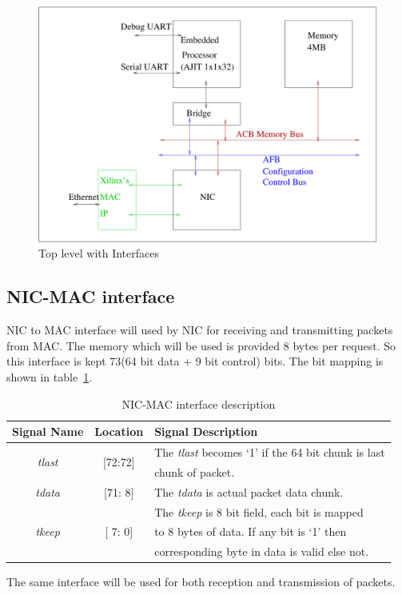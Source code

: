 \documentclass[12pt]{report}
\begin{document}
		\begin{figure}[h]
			\centering
			\includegraphics[width=12cm]{./figures/top_level_for_interfaces.pdf}
			\caption{Top level with Interfaces}
			\label{fig:NIC-Proc-top-level}
		\end{figure}




		\subsection{NIC-MAC interface}
			NIC to MAC interface will used by NIC for receiving and transmitting packets from MAC. The memory which will be used is provided 8 bytes per request.
			So this interface is kept 73(64 bit data + 9 bit control) bits. The bit mapping is shown in table~\ref{tab:NIC-MAC-interface}.
				\begin{table}[!htbp]
					\centering
					\begin{tabular}{ccl}
						\hline
						\textbf{Signal Name} & \textbf{Location} &\textbf{Signal Description}  \\ \hline
						\multirow{2}{*}{\textit{tlast}}	& \multirow{2}{*}{[72:72]}	& The \textit{tlast} becomes `1' if the 64 bit chunk is last\\
										& 				& chunk of packet.\\ \hline
						\textit{tdata}   		& [71: 8] 			& The \textit{tdata} is actual packet data chunk.\\ \hline
						\multirow{3}{*}{\textit{tkeep}}	& \multirow{3}{*}{[ 7: 0]}	& The \textit{tkeep} is 8 bit field, each bit is mapped\\
										&				& to 8 bytes of data. If any bit is `1' then\\
										& 				& corresponding byte in data is valid else not.\\ \hline 
					\end{tabular}
					\caption{NIC-MAC interface description}
					\label{tab:NIC-MAC-interface}
				\end{table}
			The same interface will be used for both reception and transmission of packets.
\end{document}
